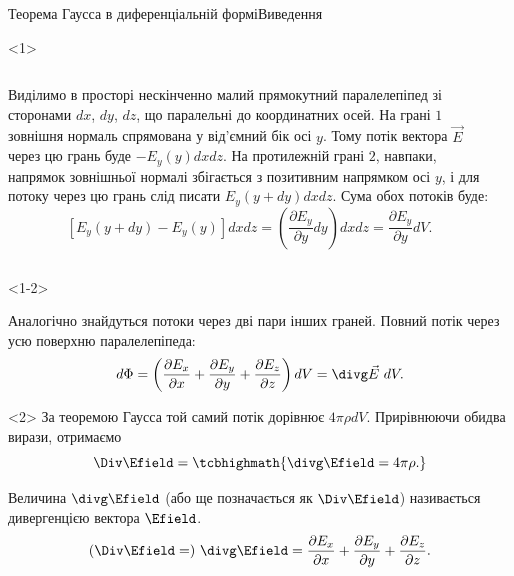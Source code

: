 \documentclass{beamer}
\begin{document}
\begin{frame}{Теорема Гаусса в диференціальній формі}{Виведення}
	\begin{onlyenv}
		\begin{columns}
			\begin{column}{0.6\linewidth}\justifying\small
				Виділимо в просторі нескінченно малий прямокутний паралелепіпед зі
				сторонами $dx$, $dy$, $dz$, що паралельні до координатних осей. На
				грані $1$ зовнішня нормаль спрямована у від'ємний бік осі $y$.
				Тому потік вектора $\vec{E}$ через цю грань буде $-E_y(y) dx dz$.
				На протилежній грані $2$, навпаки, напрямок зовнішньої нормалі
				збігається з позитивним напрямком осі $y$, і для потоку через цю
				грань слід писати $E_y(y + dy) dx dz$. Сума обох потоків буде:
				\begin{equation*}
					\left[E_y(y + dy) - E_y(y) \right] dxdz = \left( \frac{\partial
						E_y}{\partial y} dy\right) dxdz = \frac{\partial
						E_y}{\partial y} dV.
				\end{equation*}
			\end{column}
			\begin{column}{0.4\linewidth}\centering
				
			\end{column}
		\end{columns}
	\end{onlyenv}
	\begin{onlyenv}<1-2>
		\begin{block}{}
			Аналогічно знайдуться потоки через дві пари інших граней. Повний потік
			через усю поверхню паралелепіпеда:
			\begin{equation*}
				d\Phi = \left( \frac{\partial E_x}{\partial x} + \frac{\partial
					E_y}{\partial y} + \frac{\partial E_z}{\partial z} \right)  dV =
				\divg\vec{E}\ dV.
			\end{equation*}
		\end{block}
	\end{onlyenv}
	\begin{onlyenv}
		За теоремою Гаусса той самий потік дорівнює $4\pi\rho dV$. Прирівнюючи обидва
		вирази, отримаємо
		\begin{equation*}
			\Div\Efield = \tcbhighmath{
				\divg\Efield = 4\pi\rho.
			}
		\end{equation*}
		\begin{block}{}\justifying
			Величина $\divg\Efield$ (або ще позначається як $\Div\Efield$)
			називається дивергенцією вектора $\Efield$.
			\begin{equation*}
				(\Div\Efield = )\ \divg\Efield = \frac{\partial
					E_x}{\partial
					x} +
				\frac{\partial
					E_y}{\partial y} + \frac{\partial E_z}{\partial z}.
			\end{equation*}
		\end{block}
	\end{onlyenv}
\end{frame}
\end{document}
